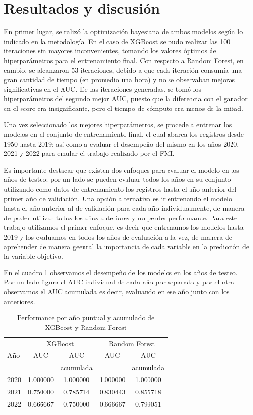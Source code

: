\documentclass{article}
\begin{document}
\section{Resultados y discusión}
En primer lugar, se ralizó la optimización bayesiana de ambos modelos según lo indicado
en la metodología. En el caso de XGBoost se pudo realizar las 100 iteraciones sin mayores
inconvenientes, tomando los valores óptimos de hiperparámetros para el entrenamiento 
final.
Con respecto a Random Forest, en cambio, se alcanzaron 53 iteraciones, debido a que cada
iteración consumía una gran cantidad de tiempo (en promedio una hora) y no se observaban
mejoras significativas en el AUC. De las iteraciones generadas, se tomó los 
hiperparámetros
del segundo mejor AUC, puesto que la diferencia con el ganador en el score era 
insignificante, pero el tiempo de cómputo era menos de la mitad.

Una vez seleccionado los mejores hiperparámetros, se procede a entrenar los modelos en el
conjunto de entrenamiento final, el cual abarca los registros desde 1950 hasta 2019; así
como a evaluar el desempeño del mismo en los años 2020, 2021 y 2022 para emular el trabajo
realizado por el FMI.

Es importante destacar que existen dos enfoques para evaluar el modelo en los años de
testeo: por un lado se pueden evaluar todos los años en su conjunto utilizando como datos
de entrenamiento los registros hasta el año anterior del primer año de validación. Una
opción alternativa es ir entrenando el modelo hasta el año anterior al de validación para
cada año individualmente, de manera de poder utilizar todos los años anteriores y no 
perder
performance. Para este trabajo utilizamos el primer enfoque, es decir que entrenamos los 
modelos hasta 2019 y los evaluamos en todos los años de evaluación a la vez, de manera de
aprehender de manera geenral la importancia de cada variable en la predicción de la
variable objetivo.

En el cuadro \ref{tab:performance} observamos el desempeño de los modelos en los años
de testeo. Por un lado figura el AUC individual de cada año por separado y por el otro
observamos el AUC acumulada es decir, evaluando en ese año junto con los anteriores.

\begin{table}[H]
  \centering
    \begin{tabular}{lcccc}
      \toprule
      & \multicolumn{2}{c}{XGBoost} & \multicolumn{2}{c}{Random Forest} \\
      Año  & AUC      & AUC      & AUC      & AUC  \\
           &          & acumulada&          & acumulada \\
      \midrule
      2020 & 1.000000 & 1.000000 & 1.000000 & 1.000000 \\
      2021 & 0.750000 & 0.785714 & 0.830443 & 0.855718 \\
      2022 & 0.666667 & 0.750000 & 0.666667 & 0.799051 \\
      \bottomrule
    \end{tabular}
  \caption{Performance por año puntual y acumulado de XGBoost y 
  Random Forest\label{tab:performance}}
\end{table}
\end{document}
